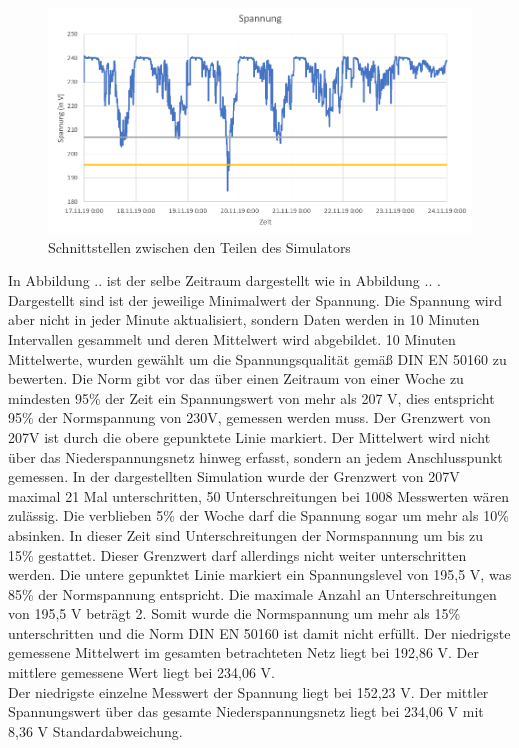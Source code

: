 \begin{figure}[htb]
\centering
	\includegraphics[width=\textwidth]{img/VDE_tau/Spannung10m.png}
	\caption{Schnittstellen zwischen den Teilen des Simulators}
	\label{Abb_VDEtauSpannung10m}
\end{figure}
In Abbildung .. ist der selbe Zeitraum dargestellt wie in Abbildung .. . Dargestellt sind ist der jeweilige Minimalwert der Spannung. Die Spannung wird aber nicht in jeder Minute aktualisiert, sondern Daten werden in 10 Minuten Intervallen gesammelt und deren Mittelwert wird abgebildet. 10 Minuten Mittelwerte, wurden gewählt um die Spannungsqualität gemäß DIN EN 50160 zu bewerten. Die Norm gibt vor das über einen Zeitraum von einer Woche zu mindesten 95\% der Zeit ein Spannungswert von mehr als 207 V, dies entspricht 95\% der Normspannung von 230V, gemessen werden muss. Der Grenzwert von 207V ist durch die obere gepunktete Linie markiert. Der Mittelwert wird nicht über das Niederspannungsnetz hinweg erfasst, sondern an jedem Anschlusspunkt gemessen. In der dargestellten Simulation wurde der Grenzwert von 207V maximal 21 Mal unterschritten, 50 Unterschreitungen bei 1008 Messwerten wären zulässig. Die verblieben 5\% der Woche darf die Spannung sogar um mehr als 10\% absinken. In dieser Zeit sind Unterschreitungen der Normspannung um bis zu 15\% gestattet. Dieser Grenzwert darf allerdings nicht weiter unterschritten werden. Die untere gepunktet Linie markiert ein Spannungslevel von 195,5 V, was 85\% der Normspannung entspricht. Die maximale Anzahl an Unterschreitungen von 195,5 V beträgt 2. Somit wurde die Normspannung um mehr als 15\% unterschritten und die Norm DIN EN 50160 ist damit nicht erfüllt. Der niedrigste gemessene Mittelwert im gesamten betrachteten Netz liegt bei 192,86 V. Der mittlere gemessene Wert liegt bei 234,06 V.\\
Der niedrigste einzelne Messwert der Spannung liegt bei 152,23 V. Der mittler Spannungswert über das gesamte Niederspannungsnetz liegt bei 234,06 V mit 8,36 V Standardabweichung. 
